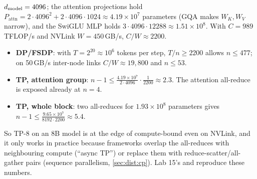\begin{napkinmath}
$d_{\text{model}}=4096$; the attention projections hold $P_\text{attn} = 2\cdot4096^2 + 2\cdot4096\cdot1024
\approx 4.19\times10^7$ parameters (GQA makes $W_K, W_V$ narrow), and the SwiGLU MLP holds
$3\cdot4096\cdot12288\approx1.51\times10^8$. With $C=989$\,TFLOP/s and NVLink $W=450$\,GB/s,
$C/W\approx2200$.
\begin{itemize}
  \item \textbf{DP/FSDP}: with $T = 2^{20}\approx10^6$ tokens per step, $T/n \ge 2200$ allows
    $n\le 477$; on 50\,GB/s inter-node links $C/W\approx19{,}800$ and $n\le 53$.
  \item \textbf{TP, attention group}: $n-1 \le \frac{4.19\times10^7}{2\cdot4096}\cdot\frac{1}{2200}\approx2.3$.
    The attention all-reduce is exposed already at $n=4$.
  \item \textbf{TP, whole block}: two all-reduces for $1.93\times10^8$ parameters gives
    $n-1\le\frac{9.65\times10^7}{8192\cdot2200}\approx5.4$.
\end{itemize}
So TP-8 on an 8B model is at the edge of compute-bound even on NVLink, and it only works in
practice because frameworks overlap the all-reduces with neighbouring compute (``async TP'') or
replace them with reduce-scatter/all-gather pairs (sequence parallelism, \cref{sec:dist:cp}). Lab
15's  and  reproduce these numbers.
\end{napkinmath}

